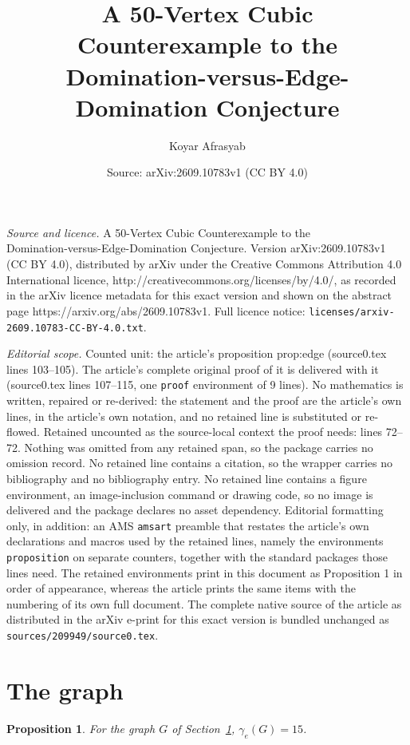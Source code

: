 \documentclass[10pt,a4paper]{amsart}
\title{A 50-Vertex Cubic Counterexample to the\\Domination-versus-Edge-Domination Conjecture}
\author{Koyar Afrasyab}
\date{Source: arXiv:2609.10783v1 (CC BY 4.0)}
\newtheorem{proposition}{Proposition}
\begin{document}
\maketitle

\noindent\emph{Source and licence.} A 50-Vertex Cubic Counterexample to the\\Domination-versus-Edge-Domination Conjecture. Version arXiv:2609.10783v1 (CC BY 4.0), distributed by arXiv under the Creative Commons Attribution 4.0 International licence, http://creativecommons.org/licenses/by/4.0/, as recorded in the arXiv licence metadata for this exact version and shown on the abstract page https://arxiv.org/abs/2609.10783v1. Full licence notice: \texttt{licenses/arxiv-2609.10783-CC-BY-4.0.txt}.\par\smallskip

\noindent\textit{Editorial scope.} Counted unit: the article's proposition prop:edge (source0.tex lines 103--105). The article's complete original proof of it is delivered with it (source0.tex lines 107--115, one \texttt{proof} environment of 9 lines). No mathematics is written, repaired or re-derived: the statement and the proof are the article's own lines, in the article's own notation, and no retained line is substituted or re-flowed.  Retained uncounted as the source-local context the proof needs: lines 72--72.  Nothing was omitted from any retained span, so the package carries no omission record.  No retained line contains a citation, so the wrapper carries no bibliography and no bibliography entry.  No retained line contains a figure environment, an image-inclusion command or drawing code, so no image is delivered and the package declares no asset dependency.  Editorial formatting only, in addition: an AMS \texttt{amsart} preamble that restates the article's own declarations and macros used by the retained lines, namely the environments \texttt{proposition} on separate counters, together with the standard packages those lines need.  The retained environments print in this document as Proposition 1 in order of appearance, whereas the article prints the same items with the numbering of its own full document.  The complete native source of the article as distributed in the arXiv e-print for this exact version is bundled unchanged as \texttt{sources/209949/source0.tex}.
\section{The graph}\label{sec:graph}

\begin{proposition}\label{prop:edge}
For the graph \(G\) of Section~\ref{sec:graph}, \(\gamma_e(G)=15\).
\end{proposition}
\end{document}
